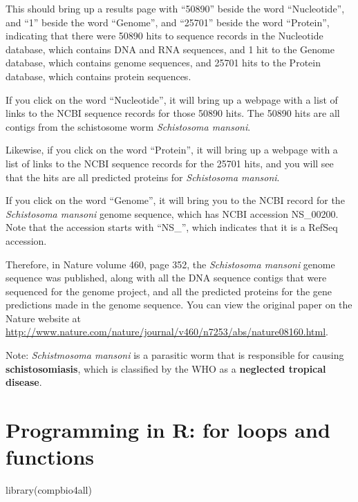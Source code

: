 \documentclass[
]{book}
\newenvironment{Shaded}{\begin{snugshade}}{\end{snugshade}}
\newcommand{\FunctionTok}[1]{\textcolor[rgb]{0.00,0.00,0.00}{#1}}
\newcommand{\NormalTok}[1]{#1}
\begin{document}
This should bring up a results page with ``50890'' beside the word ``Nucleotide'', and ``1'' beside the word ``Genome'', and ``25701'' beside the word ``Protein'', indicating that there were 50890 hits to sequence records in the Nucleotide database, which contains DNA and RNA sequences, and 1 hit to the Genome database, which contains genome sequences, and 25701 hits to the Protein database, which contains protein sequences.

If you click on the word ``Nucleotide'', it will bring up a webpage with a list of links to the NCBI sequence records for those 50890 hits. The 50890 hits are all contigs from the schistosome worm \emph{Schistosoma mansoni}.

Likewise, if you click on the word ``Protein'', it will bring up a webpage with a list of links to the NCBI sequence records for the 25701 hits, and you will see that the hits are all predicted proteins for \emph{Schistosoma mansoni}.

If you click on the word ``Genome'', it will bring you to the NCBI record for the \emph{Schistosoma mansoni} genome sequence, which has NCBI accession NS\_00200. Note that the accession starts with ``NS\_'', which indicates that it is a RefSeq accession.

Therefore, in Nature volume 460, page 352, the \emph{Schistosoma mansoni} genome sequence was published, along with all the DNA sequence contigs that were sequenced for the genome project, and all the predicted proteins for the gene predictions made in the genome sequence. You can view the original paper on the Nature website at \url{http://www.nature.com/nature/journal/v460/n7253/abs/nature08160.html}.

Note: \emph{Schistmosoma mansoni} is a parasitic worm that is responsible for causing \textbf{schistosomiasis}, which is classified by the WHO as a \textbf{neglected tropical disease}.

\hypertarget{programming-in-r-for-loops-and-functions}{%
\chapter{Programming in R: for loops and functions}\label{programming-in-r-for-loops-and-functions}}

\begin{Shaded}
\begin{Highlighting}[]
\FunctionTok{library}\NormalTok{(compbio4all)}
\end{Highlighting}
\end{Shaded}
\end{document}
